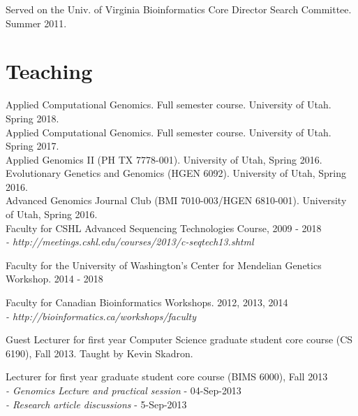 \documentclass[margin,line]{cv}
\begin{document}
\begin{resume}
    \vspace{-2mm}
    Served on the Univ. of Virginia Bioinformatics Core Director Search Committee. \\
    Summer 2011.



    \section{\mysidestyle Teaching}
    Applied Computational Genomics. Full semester course. University of Utah. Spring 2018. \\
    Applied Computational Genomics. Full semester course. University of Utah. Spring 2017. \\
    Applied Genomics II (PH TX 7778-001). University of Utah, Spring 2016. \\
    Evolutionary Genetics and Genomics (HGEN 6092). University of Utah, Spring 2016. \\
    Advanced Genomics Journal Club (BMI 7010-003/HGEN 6810-001). University of Utah, Spring 2016. \\
    Faculty for CSHL Advanced Sequencing Technologies Course, 2009 - 2018\\
    \emph{- http://meetings.cshl.edu/courses/2013/c-seqtech13.shtml}

    \vspace{-2mm}
    Faculty for the University of Washington's Center for Mendelian Genetics Workshop. 2014 - 2018

    \vspace{-2mm}
    Faculty for Canadian Bioinformatics Workshops. 2012, 2013, 2014 \\
    \emph{- http://bioinformatics.ca/workshops/faculty}

    \vspace{-2mm}
    Guest Lecturer for first year Computer Science graduate student core course (CS 6190), Fall 2013. Taught by Kevin Skadron.

    \vspace{-2mm}
    Lecturer for first year graduate student core course (BIMS 6000), Fall 2013 \\
    \emph{- Genomics Lecture and practical session} - 04-Sep-2013 \\
    \emph{- Research article discussions} - 5-Sep-2013


\end{resume}
\end{document}
